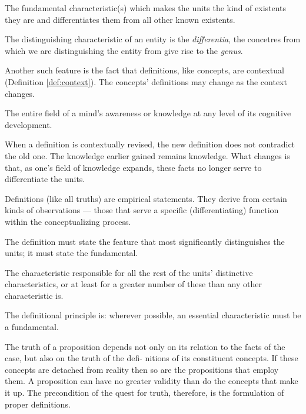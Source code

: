             \begin{definition}
            \label{def:essential_characteristic}
                The fundamental characteristic(s) which makes the units the kind of existents they are and differentiates them from all other known existents.
            \end{definition}

        The distinguishing characteristic of an entity is the \textit{differentia}, the concetres from which we are distinguishing the entity from give rise to the \textit{genus}.

        Another such feature is the fact that definitions, like concepts, are contextual (Definition \ref{def:context}). The concepts' definitions may change as the context changes.

            \begin{definition}[Context]
            \label{def:context}
                The entire field of a mind's awareness or knowledge at any level of its cognitive development.
            \end{definition}

        When a definition is contextually revised, the new definition does not contradict the old one. The knowledge earlier gained remains knowledge. What changes is that, as one's field of knowledge expands, these facts no longer serve to differentiate the units.

        Definitions (like all truths) are  empirical statements. They derive from certain kinds of observations — those that serve a specific (differentiating) function within the conceptualizing process.

        The definition must state the feature that most significantly distinguishes the units; it must state the fundamental. 

            \begin{definition}[Fundamental]
            \label{def:fundamental}
                The characteristic responsible for all the rest of the units' distinctive characteristics, or at least for a greater number of these than any other characteristic is.
            \end{definition}

        The definitional principle is: wherever possible, an essential characteristic must be a fundamental.

        The truth of a proposition depends not only on its relation to the facts of the case, but also on the truth of the defi- nitions of its constituent concepts. If these concepts are detached from reality then so are the propositions that employ them. A proposition can have no greater validity than do the concepts that make it up. The precondition of the quest for truth, therefore, is the formulation of proper definitions.

